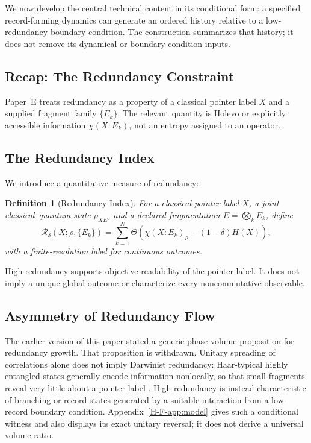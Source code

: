 \documentclass[12pt,a4paper,openany]{book}
\newtheorem{definition}[theorem]{Definition}
\begin{document}
We now develop the central technical content in its conditional form: a specified record-forming dynamics can generate an ordered history relative to a low-redundancy boundary condition.  The construction summarizes that history; it does not remove its dynamical or boundary-condition inputs.

\subsection{Recap: The Redundancy Constraint}

Paper~E \cite{Liu2026PaperE} treats redundancy as a property of a classical pointer label $X$ and a supplied fragment family $\{E_k\}$.  The relevant quantity is Holevo or explicitly accessible information $\chi(X:E_k)$, not an entropy assigned to an operator.

\subsection{The Redundancy Index}

We introduce a quantitative measure of redundancy:

\begin{definition}[Redundancy Index]
\label{H-F-def:redundancy}
For a classical pointer label $X$, a joint classical--quantum state $\rho_{XE}$, and a declared fragmentation $E=\bigotimes_kE_k$, define
\begin{equation}
\mathcal{R}_\delta(X;\rho,\{E_k\})
=\sum_{k=1}^{N}\Theta\!\left(
\chi(X:E_k)_\rho-(1-\delta)H(X)\right),
\end{equation}
with a finite-resolution label for continuous outcomes.
\end{definition}

High redundancy supports objective readability of the pointer label.  It does not imply a unique global outcome or characterize every noncommutative observable.

\subsection{Asymmetry of Redundancy Flow}

The earlier version of this paper stated a generic phase-volume proposition for redundancy growth.  That proposition is withdrawn.  Unitary spreading of correlations alone does not imply Darwinist redundancy: Haar-typical highly entangled states generally encode information nonlocally, so that small fragments reveal very little about a pointer label \cite{Page1993,HaydenPreskill2007}.  High redundancy is instead characteristic of branching or record states generated by a suitable interaction from a low-record boundary condition.  Appendix~\ref{H-F-app:model} gives such a conditional witness and also displays its exact unitary reversal; it does not derive a universal volume ratio.
\end{document}
